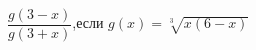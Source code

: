 \begin{ex}[type=calculate_expression]
	\begin{condition}
		\( \dfrac{g(3-x)}{g(3+x)} \),\quad если \( g(x)=\sqrt[3]{x(6-x)} \)
	\end{condition}
\end{ex}
